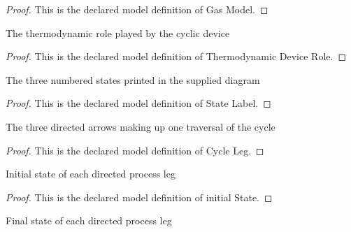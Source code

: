 \begin{proof}
  This is the declared model definition of Gas Model.
\end{proof}
\begin{definition}
  \label{def:physics:phyx-mini-0427:phyxminiproblems-problemphyxmini0427-thermodynamicdevicerole}
  The thermodynamic role played by the cyclic device
\end{definition}
\begin{proof}
  This is the declared model definition of Thermodynamic Device Role.
\end{proof}
\begin{definition}
  \label{def:physics:phyx-mini-0427:phyxminiproblems-problemphyxmini0427-statelabel}
  The three numbered states printed in the supplied diagram
\end{definition}
\begin{proof}
  This is the declared model definition of State Label.
\end{proof}
\begin{definition}
  \label{def:physics:phyx-mini-0427:phyxminiproblems-problemphyxmini0427-cycleleg}
  The three directed arrows making up one traversal of the cycle
\end{definition}
\begin{proof}
  This is the declared model definition of Cycle Leg.
\end{proof}
\begin{definition}
  \label{def:physics:phyx-mini-0427:phyxminiproblems-problemphyxmini0427-cycleleg-initialstate}
  Initial state of each directed process leg
\end{definition}
\begin{proof}
  This is the declared model definition of initial State.
\end{proof}
\begin{definition}
  \label{def:physics:phyx-mini-0427:phyxminiproblems-problemphyxmini0427-cycleleg-finalstate}
  Final state of each directed process leg
\end{definition}
